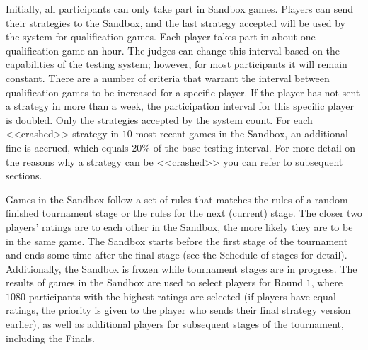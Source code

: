 Initially, all participants can only take part in Sandbox games. Players can send their strategies to the Sandbox, and
the last strategy accepted will be used by the system for qualification games. Each player takes part in about one qualification
game an hour. The judges can change this interval based on the capabilities of the testing system; however, for
most participants it will remain constant. There are a number of criteria that warrant the interval between qualification games
to be increased for a specific player. If the player has not sent a strategy in more than a week, the participation interval
for this specific player is doubled. Only the strategies accepted by the system count. For each <<crashed>> strategy in $10$ most recent
games in the Sandbox, an additional fine is accrued, which equals $20\%$ of the base testing interval. For more detail on the reasons why a strategy can be <<crashed>>
you can refer to subsequent sections.

Games in the Sandbox follow a set of rules that matches the rules of a random finished tournament stage or the rules for the next
(current) stage. The closer two players’ ratings are to each other in the Sandbox, the more likely they are to be in
the same game. The Sandbox starts before the first stage of the tournament and ends some time after the final stage (see the Schedule
of stages for detail). Additionally, the Sandbox is frozen while tournament stages are in progress. The results of games in the Sandbox
are used to select players for Round $1$, where $1080$ participants with the highest ratings are selected (if players have equal ratings, the priority is given
to the player who sends their final strategy version earlier), as well as additional players for subsequent stages of the tournament, including the Finals.


